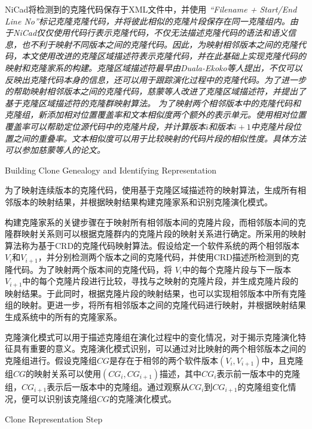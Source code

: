 NiCad将检测到的克隆代码保存于XML文件中，并使用\em{ ``Filename + Start/End Line No''}标记克隆克隆代码，并将彼此相似的克隆片段保存在同一克隆组内。由于NiCad仅仅使用代码行表示克隆代码，不仅无法描述克隆代码的语法和语义信息，也不利于映射不同版本之间的克隆代码。因此，为映射相邻版本之间的克隆代码，本文使用改进的克隆区域描述符表示克隆代码，并在此基础上实现克隆代码的映射和克隆家系的构建。克隆区域描述符最早由Duala-Ekoko等人提出，不仅可以反映出克隆代码本身的信息，还可以用于跟踪演化过程中的克隆代码\cite{duala2010clone}。为了进一步的帮助映射相邻版本之间的克隆代码，慈蒙等人改进了克隆区域描述符，并提出了基于克隆区域描述符的克隆群映射算法\cite{ci2013new}。
为了映射两个相邻版本中的克隆代码和克隆组，新添加相对位置覆盖率和文本相似度两个额外的表示单元。使用相对位置覆盖率可以帮助定位源代码中的克隆片段，并计算版本$ i $和版本$ i + 1 $中克隆片段位置之间的重叠率。文本相似度可以用于比较映射的代码片段的相似性度。具体方法可以参加慈蒙等人的论文\cite{ci2013newD}。

{Building Clone Genealogy and Identifying Representation}

为了映射连续版本的克隆代码，使用基于克隆区域描述符的映射算法，生成所有相邻版本的映射结果，并根据映射结果构建克隆家系和识别克隆演化模式。

构建克隆家系的关键步骤在于映射所有相邻版本间的克隆片段，而相邻版本间的克隆群映射关系则可以根据克隆群内的克隆片段的映射关系进行确定。所采用的映射算法称为基于CRD的克隆代码映射算法\cite{ci2013new}\cite{ci2013newD}。假设给定一个软件系统的两个相邻版本{$V_i$}和{$V_ {i + 1}$}，并分别检测两个版本之间的克隆代码，并使用CRD描述所检测到的克隆代码。为了映射两个版本间的克隆代码，将{ $V_i$}中的每个克隆片段与下一版本{$ V_{i+1}$}中的每个克隆片段进行比较，寻找与之映射的克隆片段，并生成克隆片段的映射结果。于此同时，根据克隆片段的映射结果，也可以实现相邻版本中所有克隆组的映射。更进一步，将所有相邻版本之间的克隆代码进行映射，并根据映射结果生成系统中的所有的克隆家系。

克隆演化模式可以用于描述克隆组在演化过程中的变化情况，对于揭示克隆演化特征具有重要的意义。克隆演化模式识别，可以通过对比映射的两个相邻版本之间的克隆组进行。假设克隆组$CG$是存在于相邻的两个软件版本{$(V_i,V_{i+1})$}中，且克隆组$CG$的映射关系可以使用{$(CG_i, CG_{i+1})$}描述，其中{$CG_i$}表示前一版本中的克隆组，{$CG_{i+1}$}表示后一版本中的克隆组。通过观察从{$CG_i$}到{$CG_{i+1}$}的克隆组变化情况，便可以识别该克隆组{$CG$}的克隆演化模式。

{Clone Representation Step}

